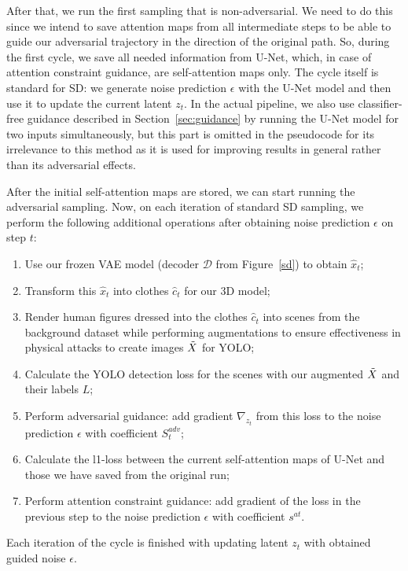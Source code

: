 After that, we run the first sampling that is non-adversarial.
We need to do this since we intend to save attention maps from all intermediate steps to be able to guide our adversarial trajectory in the direction of the original path.
So, during the first cycle, we save all needed information from U-Net, which, in case of attention constraint guidance, are self-attention maps only.
The cycle itself is standard for SD: we generate noise prediction $\epsilon$ with the U-Net model and then use it to update the current latent $z_t$. 
In the actual pipeline, we also use classifier-free guidance described in Section~\ref{sec:guidance} by running the U-Net model for two inputs simultaneously, but this part is omitted in the pseudocode for its irrelevance to this method as it is used for improving results in general rather than its adversarial effects.

After the initial self-attention maps are stored, we can start running the adversarial sampling.
Now, on each iteration of standard SD sampling, we perform the following additional operations after obtaining noise prediction $\epsilon$ on step $t$:

\begin{enumerate}
    \item Use our frozen VAE model (decoder $\mathcal{D}$ from Figure~\ref{sd}) to obtain $\hat x_t$;
    \item Transform this $\hat x_t$ into clothes $\hat c_t$ for our 3D model;
    \item Render human figures dressed into the clothes $\hat c_t$ into scenes from the background dataset while performing augmentations to ensure effectiveness in physical attacks to create images $\Tilde{X}$ for YOLO;
    \item Calculate the YOLO detection loss for the scenes with our augmented $\Tilde{X}$ and their labels $L$;
    \item Perform adversarial guidance: add gradient $\nabla_{z_t}$ from this loss to the noise prediction $\epsilon$ with coefficient $S^{adv}_t$;
    \item Calculate the l1-loss between the current self-attention maps of U-Net and those we have saved from the original run;
    \item Perform attention constraint guidance: add gradient of the loss in the previous step to the noise prediction $\epsilon$ with coefficient $s^{at}$.
\end{enumerate}

Each iteration of the cycle is finished with updating latent $z_t$ with obtained guided noise $\epsilon$.

